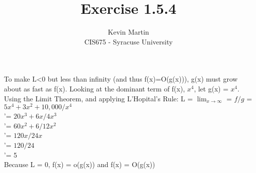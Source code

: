 \documentclass{article}
\author{Kevin Martin\\ CIS675 - Syracuse University}
\title{Exercise 1.5.4}
\begin{document}
\maketitle

To make L<0 but less than infinity (and thus f(x)=O(g(x))), g(x) must grow about as fast as f(x).
Looking at the dominant term of f(x), \(x^4\), let g(x) = \(x^4\). Using the Limit Theorem, and applying L'Hopital's Rule:
L = $\lim_{x\to\infty}$ = \(f/g\) = \(5x^4+3x^2+10,000/x^4\)\\
 '= \(20x^3+6x/4x^3\)\\
 '= \(60x^2+6/12x^2\)\\
 '= \(120x/24x\)\\
 '= \(120/24\)\\
 '= 5\\
 Because L = 0, f(x) = o(g(x)) and f(x) = O(g(x))
\end{document}
